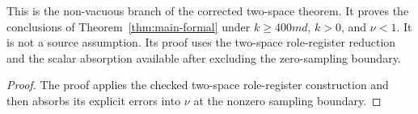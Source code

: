 \begin{proposition}\label{prop:main-formal-source-small-error}
	\leanok
	This is the non-vacuous branch of the corrected two-space theorem.
	It proves the conclusions of Theorem~\ref{thm:main-formal} under
	\(k\ge 400md\), \(k>0\), and \(\nu<1\).  It is not a source assumption.  Its
	proof uses the two-space role-register reduction and the scalar absorption
	available after excluding the zero-sampling boundary.
\end{proposition}
\begin{proof}
	\leanok
	The proof applies the checked two-space role-register construction and then
	absorbs its explicit errors into \(\nu\) at the nonzero sampling boundary.
\end{proof}

